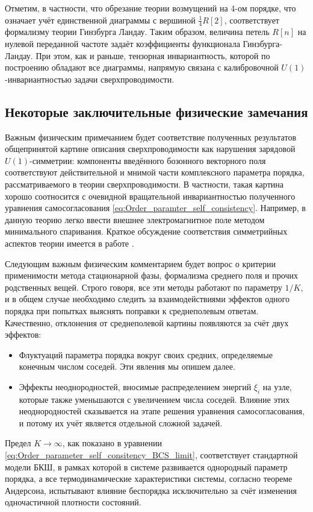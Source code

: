 Отметим, в частности, что обрезание теории возмущений на 4-ом порядке, что означает учёт единственной диаграммы с вершиной $\frac{1}{4}R[2]$, соответствует формализму теории Гинзбурга Ландау. Таким образом, величина петель $R[n]$ на нулевой переданной частоте задаёт коэффициенты функционала Гинзбурга-Ландау. При этом, как и раньше, тензорная инвариантность, которой по построению обладают все диаграммы, напрямую связана с калибровочной $U(1)$-инвариантностью задачи сверхпроводимости.


\subsection{Некоторые заключительные физические замечания}
Важным физическим примечанием будет соответствие полученных результатов общепринятой картине описания сверхпроводимости как нарушения зарядовой $U(1)$-симметрии: компоненты введённого бозонного векторного поля соответствуют действительной и мнимой части комплексного параметра порядка, рассматриваемого в теории сверхпроводимости. В частности, такая картина хорошо соотносится с очевидной вращательной инвариантностью полученного уравнения самосогласования \eqref{eq:Order_paramter_self_consistency}. Например, в данную теорию легко ввести внешнее электромагнитное поле методом минимального спаривания. Краткое обсуждение соответствия симметрийных аспектов теории имеется в работе \cite{Poboiko_Feigelman_Paraconductivity}.

Следующим важным физическим комментарием будет вопрос о критерии применимости метода стационарной фазы, формализма среднего поля и прочих родственных вещей. Строго говоря, все эти методы работают по параметру $1/K$, и в общем случае необходимо следить за взаимодействиями эффектов одного порядка при попытках выяснять поправки к среднеполевым ответам. Качественно, отклонения от среднеполевой картины появляются за счёт двух эффектов:
\begin{itemize}
	\item Флуктуаций параметра порядка вокруг своих средних, определяемые конечным числом соседей. Эти явления мы опишем далее.
	
	\item Эффекты неоднородностей, вносимые распределением энергий $\xi_i$ на узле, которые также уменьшаются с увеличением числа соседей. Влияние этих неоднородностей сказывается на этапе решения уравнения самосогласования, и потому их учёт является отдельной сложной задачей.
\end{itemize}
Предел $K \rightarrow \infty$, как показано в уравнении \eqref{eq:Order_parameter_self_consitency_BCS_limit}, соответствует стандартной модели БКШ, в рамках которой в системе развивается однородный параметр порядка, а все термодинамические характеристики системы, согласно теореме Андерсона, испытывают влияние беспорядка исключительно за счёт изменения одночастичной плотности состояний.

